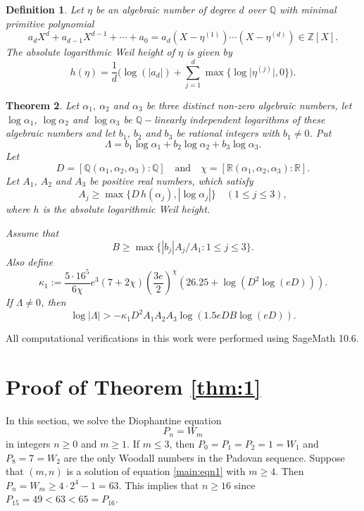 \documentclass[11pt,a4paper]{article}
\newtheorem{theorem}{Theorem}[section]
\newtheorem{definition}[theorem]{Definition}
\numberwithin{equation}{section}
\numberwithin{table}{section}
\numberwithin{figure}{section}
\begin{document}
\begin{definition}\label{def}
	Let $ \eta $ be an algebraic number of degree $d$ over $\mathbb{Q}$ with minimal primitive polynomial 
	$$ a_{d}X^{d}+a_{d-1}X^{d-1}+\cdots +a_{0}=a_{d}(X-\eta^{(1)})\cdots (X-\eta^{(d)})\in \mathbb{Z}\left[X\right]. $$ 
	The absolute logarithmic Weil height of $\eta$ is given by 
	$$h(\eta)= \dfrac{1}{d}\Bigg(\log (|a_d|) + \sum_{j=1}^{d}\max \big\{\log \big|\eta^{(j)}\big|,0\big\}\Bigg).$$
\end{definition}

\begin{theorem}\label{Matveev}
Let $\alpha_{1}$, $\alpha_{2}$ and $\alpha_{3}$ be three distinct non-zero algebraic numbers, let $\log \alpha_{1}$, $\log \alpha_{2}$ and $\log \alpha_{3}$ be $\mathbb{Q}-$linearly independent logarithms of these algebraic numbers and let $b_{1}$, $b_{2}$ and $b_{3}$ be rational integers with $b_1\neq 0$. Put
$$
\Lambda=b_{1}\log \alpha_{1}+b_{2}\log \alpha_{2}+b_{3}\log \alpha_{3}.
$$
Let
$$
D=[\mathbb{Q}(\alpha_1,\alpha_2,\alpha_3):\mathbb{Q}]\quad \text{and}\quad \chi =[\mathbb{R}(\alpha_{1},\alpha_{2},\alpha_{3}):\mathbb{R}].
$$
Let $A_1$, $A_2$ and $A_3$ be positive real numbers, which satisfy
$$
A_{j}\ge \max \{D\,h(\alpha_{j}),|\log \alpha_{j}|\}\quad (1\le j\le 3),
$$
where $h$ is the absolute logarithmic Weil height.

Assume that
$$
B\ge \max \{|b_{j}|A_{j}/A_{1}:1\le j\le 3\}.
$$
Also define
$$
\kappa_1:=\frac{5\cdot 16^{5}}{6\chi}e^{3}(7+2\chi)\left(\frac{3e}{2}\right)^{\chi}\left(26.25+\log (D^{2}\log (eD))\right).
$$
If $\Lambda \neq 0$, then
$$
\log |\Lambda|>-\kappa_{1}D^{2}A_{1}A_{2}A_{3}\log (1.5eDB\log (eD)).
$$
\end{theorem}

All computational verifications in this work were performed using SageMath 10.6.

\section{Proof of Theorem \ref{thm:1}}

In this section, we solve the Diophantine equation
\begin{equation}\label{main:eqn1}
P_n=W_m
\end{equation}
in integers $n\ge 0$ and $m\ge 1$. If $m\le 3$, then $P_{0}=P_{1}=P_{2}=1=W_{1}$ and $P_{8}=7=W_{2}$ are the only Woodall numbers in the Padovan sequence. Suppose that $(m,n)$ is a solution of equation \eqref{main:eqn1} with $m\ge 4$. Then $P_{n}=W_{m}\ge 4\cdot 2^{4}-1=63$. This implies that $n\ge 16$ since $P_{15}=49<63<65=P_{16}$.
\end{document}

